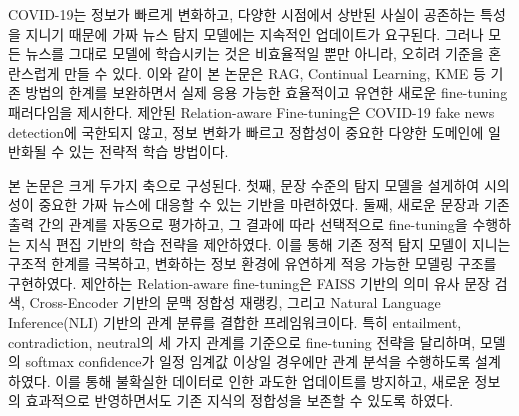 \documentclass[a4paper,fleqn]{cas-sc}
\begin{document}

COVID-19는 정보가 빠르게 변화하고, 다양한 시점에서 상반된 사실이 공존하는 특성을 지니기 때문에 가짜 뉴스 탐지 모델에는 지속적인 업데이트가 요구된다.
그러나 모든 뉴스를 그대로 모델에 학습시키는 것은 비효율적일 뿐만 아니라, 오히려 기준을 혼란스럽게 만들 수 있다. 
이와 같이 본 논문은 RAG, Continual Learning, KME 등 기존 방법의 한계를 보완하면서 실제 응용 가능한 효율적이고 유연한 새로운 fine-tuning 패러다임을 제시한다. 
제안된 Relation-aware Fine-tuning은 COVID-19 fake news detection에 국한되지 않고, 정보 변화가 빠르고 정합성이 중요한 다양한 도메인에 일반화될 수 있는 전략적 학습 방법이다.

본 논문은 크게 두가지 축으로 구성된다. 첫째, 문장 수준의 탐지 모델을 설게하여 시의성이 중요한 가짜 뉴스에 대응할 수 있는 기반을 마련하였다. 둘째, 새로운 문장과 기존 출력 간의 관계를 자동으로 평가하고, 그 결과에 따라 선택적으로 fine-tuning을 수행하는 지식 편집 기반의 학습 전략을 제안하였다. 이를 통해 기존 정적 탐지 모델이 지니는 구조적 한계를 극복하고, 변화하는 정보 환경에 유연하게 적응 가능한 모델링 구조를 구현하였다. 
제안하는 Relation-aware fine-tuning은 FAISS 기반의 의미 유사 문장 검색, Cross-Encoder 기반의 문맥 정합성 재랭킹, 그리고 Natural Language Inference(NLI) 기반의 관계 분류를 결합한 프레임워크이다. 특히 entailment, contradiction, neutral의 세 가지 관계를 기준으로 fine-tuning 전략을 달리하며, 모델의 softmax confidence가 일정 임계값 이상일 경우에만 관계 분석을 수행하도록 설계하였다. 이를 통해 불확실한 데이터로 인한 과도한 업데이트를 방지하고, 새로운 정보의 효과적으로 반영하면서도 기존 지식의 정합성을 보존할 수 있도록 하였다.




\end{document}
